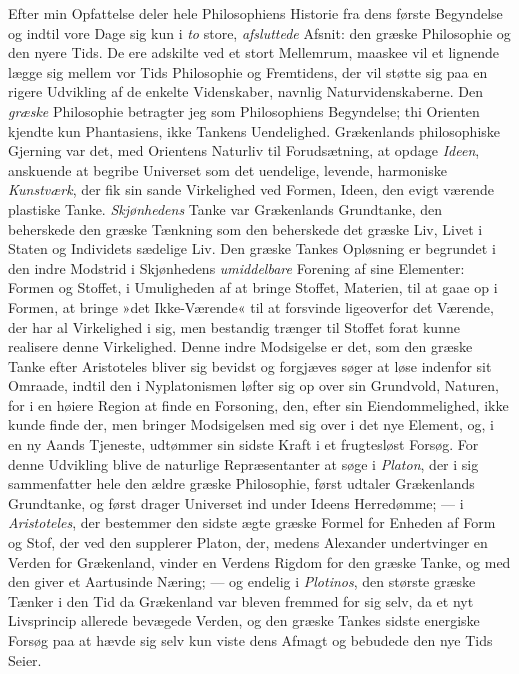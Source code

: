 \documentclass[12pt,a4paper]{book}
\newcommand{\opage}[1]{\marginnote{\footnotesize\textit{[#1]}}}
\begin{document}
Efter min Opfattelse deler hele Philosophiens Historie fra dens
første Begyndelse og indtil vore Dage sig kun i \emph{to} store,
\emph{afsluttede} Afsnit: den græske Philosophie og den nyere Tids. De
ere adskilte ved et stort Mellemrum, maaskee vil et lignende lægge sig
mellem vor Tids Philosophie og Fremtidens, der vil støtte sig paa en
rigere Udvikling af de enkelte Videnskaber, navnlig
Naturvidenskaberne. Den \emph{græske} Philosophie betragter jeg som
Philosophiens Begyndelse; thi Orienten kjendte kun Phantasiens, ikke
Tankens Uendelighed. Grækenlands philosophiske Gjerning var det, med
Orientens Naturliv til Forudsætning, at opdage \emph{Ideen},
anskuende at begribe Universet som det uendelige, levende, harmoniske
\emph{Kunstværk}, der fik sin sande Virkelighed ved Formen, Ideen, den
evigt værende plastiske Tanke. \emph{Skjønhedens} Tanke var
Grækenlands Grundtanke, den beherskede den græske Tænkning som den
beherskede det græske Liv, Livet i Staten og Individets sædelige Liv.
Den græske Tankes Opløsning er begrundet i den indre Modstrid i
Skjønhedens \emph{umiddelbare} Forening af sine Elementer: Formen og
Stoffet, i Umuligheden af at bringe Stoffet, Materien, til at gaae op
i Formen, at bringe »det Ikke-Værende« til at forsvinde ligeoverfor
det Værende, der har al Virkelighed i sig, men bestandig trænger til
Stoffet forat kunne realisere denne Virkelighed. Denne indre
Modsigelse er det, som den græske Tanke efter Aristoteles bliver sig
bevidst og forgjæves søger at løse indenfor sit Omraade, indtil den i
Nyplatonismen løfter sig op over sin
\opage{4} Grundvold, Naturen, for i en høiere Region at finde en Forsoning, den,
efter sin Eiendommelighed, ikke kunde finde der, men bringer
Modsigelsen med sig over i det nye Element, og, i en ny Aands
Tjeneste, udtømmer sin sidste Kraft i et frugtesløst Forsøg. For denne
Udvikling blive de naturlige Repræsentanter at søge i \emph{Platon},
der i sig sammenfatter hele den ældre græske Philosophie, først
udtaler Grækenlands Grundtanke, og først drager Universet ind under
Ideens Herredømme; --- i \emph{Aristoteles}, der bestemmer den sidste
ægte græske Formel for Enheden af Form og Stof, der ved den supplerer
Platon, der, medens Alexander undertvinger en Verden for Grækenland,
vinder en Verdens Rigdom for den græske Tanke, og med den giver et
Aartusinde Næring; --- og endelig i \emph{Plotinos}, den største
græske Tænker i den Tid da Grækenland var bleven fremmed for sig selv,
da et nyt Livsprincip allerede bevægede Verden, og den græske Tankes
sidste energiske Forsøg paa at hævde sig selv kun viste dens Afmagt og
bebudede den nye Tids Seier.
\end{document}
